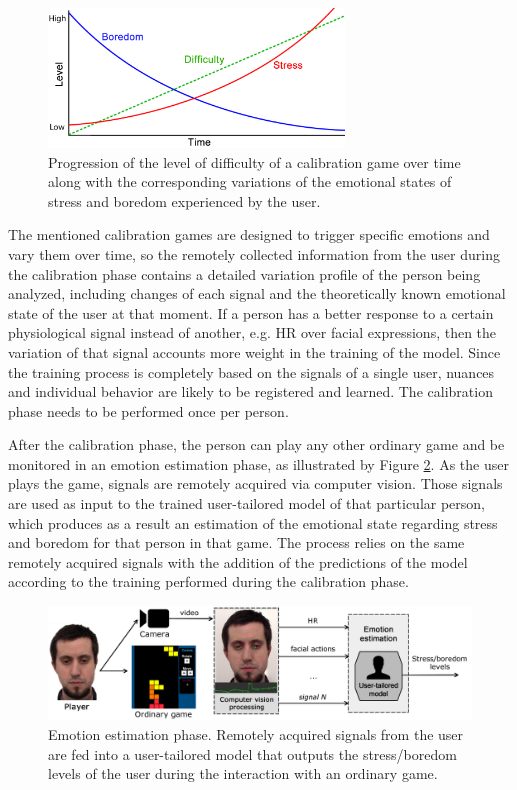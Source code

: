 \begin{figure}[h!]
    \centering
    \includegraphics[width=0.7\textwidth]{Content/figures/calibration-game-linear.png}
    \caption{Progression of the level of difficulty of a calibration game over time along with the corresponding variations of the emotional states of stress and boredom experienced by the user.}
    \label{fig:calibration-game-linear}
\end{figure}

The mentioned calibration games are designed to trigger specific emotions and vary them over time, so the remotely collected information from the user during the calibration phase contains a detailed variation profile of the person being analyzed, including changes of each signal and the theoretically known emotional state of the user at that moment. If a person has a better response to a certain physiological signal instead of another, e.g. HR over facial expressions, then the variation of that signal accounts more weight in the training of the model. Since the training process is completely based on the signals of a single user, nuances and individual behavior are likely to be registered and learned. The calibration phase needs to be performed once per person.

After the calibration phase, the person can play any other ordinary game and be monitored in an emotion estimation phase, as illustrated by Figure \ref{fig:user-tailored-use}. As the user plays the game, signals are remotely acquired via computer vision. Those signals are used as input to the trained user-tailored model of that particular person, which produces as a result an estimation of the emotional state regarding stress and boredom for that person in that game. The process relies on the same remotely acquired signals with the addition of the predictions of the model according to the training performed during the calibration phase.

\begin{figure}[h]
    \centering
    \includegraphics[width=\textwidth]{Content/figures/user-tailored-use.png}
    \caption{Emotion estimation phase. Remotely acquired signals from the user are fed into a user-tailored model that outputs the stress/boredom levels of the user during the interaction with an ordinary game.}
    \label{fig:user-tailored-use}
\end{figure}

